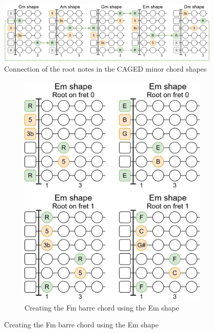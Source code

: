 \begin{figure}[h]
	\centering
	\includegraphics[width=0.95\textwidth]{../../Images/CagedOpenMinorChordShapesRootConnection.png}
	\caption{Connection of the root notes in the CAGED minor chord shapes}
	\label{fig:guitar_caged_open_minor_chord_shaped_root_connnection}
\end{figure}

\begin{figure}[h]
	\centering
	\begin{subfigure}{0.37\textwidth}
		\includegraphics[width=\textwidth]{../../Images/CagedEmShapeToFmChord.png}
		\caption{Creating the Fm barre chord using the Em shape}
		\label{fig:guitar_caged_em_shape_to_fm}
	\end{subfigure}

\end{figure}
